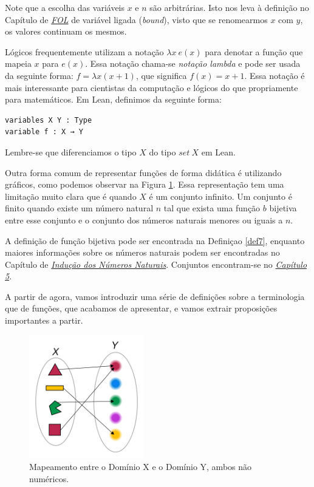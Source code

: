 Note que a escolha das variáveis $x$ e $n$ são arbitrárias. Isto nos leva à
definição no Capítulo de \textit{\hyperlink{chapter.4}{FOL}} de variável
ligada (\textit{bound}), visto que se renomearmos $x$ com $y$, os valores
continuam os mesmos.

Lógicos frequentemente utilizam a notação $\lambda x ~e(x)$ para denotar a
função que mapeia $x$ para $e(x)$. Essa notação chama-se \textit{notação
lambda} e pode ser usada da seguinte forma: $f = \lambda x(x + 1)$, que
significa $f(x) = x + 1$. Essa notação é mais interessante para cientistas da
computação e lógicos do que propriamente para matemáticos. Em Lean, definimos
da seguinte forma:

\begin{lstlisting}
variables X Y : Type
variable f : X → Y
\end{lstlisting}

Lembre-se que diferenciamos o tipo $X$ do tipo $set~X$ em Lean.

Outra forma comum de representar funções de forma didática é utilizando
gráficos, como podemos observar na Figura \ref{fig:functions-01-00}. Essa
representação tem uma limitação muito clara que é quando $X$ é um conjunto
infinito. Um conjunto é finito quando existe um número natural $n$ tal que
exista uma função $b$ bijetiva entre esse conjunto e o conjunto dos números
naturais menores ou iguais a $n$. 

A definição de função bijetiva pode ser encontrada na Definiçao \ref{def7},
enquanto maiores informações sobre os números naturais podem ser encontradas
no Capítulo de \textit{\hyperlink{chapter.8}{Indução dos Números Naturais}}.
Conjuntos encontram-se no \textit{\hyperlink{chapter.5}{Capítulo 5}}.

A partir de agora, vamos introduzir uma série de definições sobre a
terminologia que de funções, que acabamos de apresentar, e vamos extrair
proposições importantes a partir. 

\begin{figure}
    \centering      
    \includegraphics[width = 5cm]{figures/functions/fig-functions-01-00.png}
    \caption{Mapeamento entre o Domínio X e o Domínio Y, ambos não numéricos.}
    \label{fig:functions-01-00}
\end{figure}